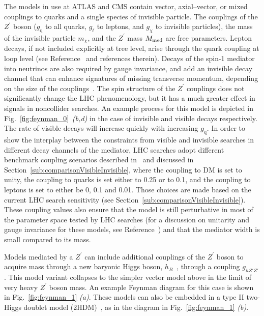 \documentclass{ar-1col}
\newcommand{\chiDM}{\ensuremath{\chi}\xspace}
\newcommand{\IP}{invisible particle}
\newcommand{\mMed}{\ensuremath{M_{\rm{med}}}\xspace}
\newcommand{\mmed}{\mMed}
\newcommand{\gDM}{\ensuremath{g_{\chiDM}}\xspace}
\newcommand{\gl}{$g_{\ell}$\xspace}
\newcommand{\gq}{$g_{\mathrm{q}}$\xspace}
\newcommand{\mdm}{\ensuremath{m_{\chiDM}}\xspace}
\newcommand{\ghZprimeZprime}{\ensuremath{g_{hZ'Z'}}\xspace}
\newcommand{\Zprime}{\ensuremath{{Z}^\prime}\xspace}
\begin{document}
The models in use at ATLAS and CMS contain vector,
axial--vector, or mixed couplings to quarks and a single species of
{\IP}. The couplings of the \Zprime boson (\gq to all quarks, \gl to
leptons, and \gDM to {\IP}s), the mass of the invisible particle \mdm, and the
\Zprime mass \mmed are free parameters. Lepton decays, if not
included explicitly at tree level, arise through the quark
coupling at loop level (see Reference~ and
references therein). Decays of the spin-1 mediator into neutrinos
are also required by gauge invariance, and add an invisible decay
channel that can enhance signatures of missing transverse
momentum, depending on the size of the
couplings~\cite{Albert:2017onk}. The spin structure of the \Zprime
couplings does not significantly change the LHC phenomenology, but it
has a much greater effect in signals in noncollider searches.
An example process for this model is depicted in Fig.~\ref{fig:feynman_0}~\textit{(b,d)} in
the case of invisible and visible decays respectively. 
The rate of visible decays will increase quickly with increasing \gq.
In order to show the interplay between the constraints from visible
and invisible searches in different decay channels of the mediator,
LHC searches adopt different benchmark coupling scenarios
described in~\cite{Albert:2017onk} and discussed in Section~\ref{sub:comparisonVisibleInvisible},
where the coupling to DM is set to unity, the coupling to quarks is set either to 0.25 or to 0.1, 
and the coupling to leptons is set to either be 0, 0.1 and 0.01. 
Those choices are made based on the current LHC search sensitivity
(see Section~\ref{sub:comparisonVisibleInvisible}). These coupling values also 
ensure that the model is still perturbative in most of the parameter space
tested by LHC searches (for a discussion on unitarity and gauge invariance for these models, see Reference~\cite{Kahlhoefer:2015bea}) and that the mediator width is small compared to its mass. 

Models mediated by a \Zprime can include additional couplings of the
\Zprime boson to acquire mass through a new baryonic Higgs boson,
$h_B$~\cite{Berlin:2014cfa}, through a coupling \ghZprimeZprime. 
This model variant collapses to the simpler vector model
above in the limit of very heavy \Zprime boson mass. 
An example Feynman diagram for this case is shown
in Fig.~\ref{fig:feynman_1} \textit{(a)}. 
These models can also be
embedded in a type II two-Higgs doublet model
(2HDM)~\cite{Berlin:2014cfa}, as in the diagram in Fig.~\ref{fig:feynman_1} \textit{(b)}.
\end{document}
